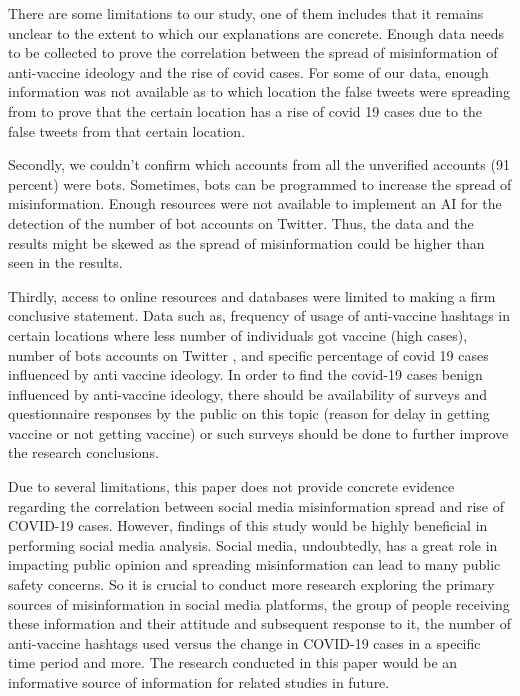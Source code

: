 \documentclass[10pt,twocolumn,letterpaper]{article}
\begin{document}
There are some limitations to our study, one of them includes that it remains unclear to the extent to which our explanations are concrete.  Enough data needs to be collected to prove the correlation between the spread of misinformation of anti-vaccine ideology and the rise of covid cases. For some of our data, enough information was not available as to which location the false tweets were spreading from  to prove that the certain location has a rise of covid 19 cases due to the false tweets from that certain location. 

Secondly, we couldn't confirm which accounts from all the unverified accounts (91 percent) were bots. Sometimes, bots can be programmed to increase the spread of misinformation.  Enough resources were not available to implement an AI for the detection of the number of  bot accounts on Twitter. Thus, the data and the results might be skewed as the spread of misinformation could be higher than seen in the results. 

Thirdly, access to online resources and databases were limited to making a firm conclusive statement. Data such as,  frequency of usage of anti-vaccine hashtags in certain locations where less number of individuals got vaccine (high cases), number of bots accounts on Twitter , and specific percentage of covid 19 cases influenced by anti vaccine ideology. In order to find the covid-19 cases benign influenced by anti-vaccine ideology, there should be availability of surveys and questionnaire responses by the public on this topic (reason for delay in getting vaccine or not getting vaccine)  or such surveys should be done to further improve the research conclusions.  


    Due to several limitations, this paper does not provide concrete evidence regarding the correlation between social media misinformation spread and rise of COVID-19 cases. However, findings of this study would be highly beneficial in performing social media analysis. Social media, undoubtedly, has a great role in impacting public opinion and spreading misinformation can lead to many public safety concerns. So it is crucial to conduct more research exploring the primary sources of misinformation in social media platforms, the group of people receiving these information and their attitude and subsequent response to it, the number of anti-vaccine hashtags used versus the change in COVID-19 cases in a specific time period and more. The research conducted in this paper would be an informative source of information for related studies in future. 
\end{document}
